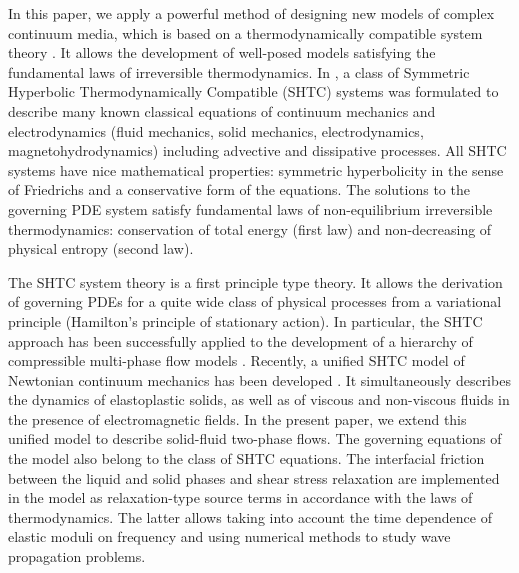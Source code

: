 \documentclass[3p,times,table]{article}
\begin{document}
In this paper, we apply a powerful method of designing  new models of 
complex continuum media, which is  based on a thermodynamically compatible system 
theory \cite{God1961,Godunov:1995a,Godunov1996}. It allows the development of 
well-posed models satisfying the
fundamental laws of irreversible thermodynamics. 
In \cite{Godunov:1995a,Rom1998,Romenski2001,Godrom2003,SHTC-GENERIC-CMAT},
a class of Symmetric Hyperbolic Thermodynamically Compatible (SHTC) systems was 
formulated  to describe many known classical equations of 
continuum mechanics and electrodynamics (fluid mechanics, solid mechanics, 
electrodynamics, magnetohydrodynamics)
including advective and dissipative processes. All SHTC systems have nice 
mathematical properties: symmetric hyperbolicity in the sense of Friedrichs 
\cite{Friedrichs1958} and
a conservative form of the equations. The solutions to the governing PDE system 
satisfy 
fundamental laws of non-equilibrium irreversible thermodynamics:  
conservation of total energy (first law) and non-decreasing of  physical 
entropy (second law). 

The SHTC system theory is a first principle type theory. It allows the derivation of
governing PDEs for a quite wide class of physical 
processes from a variational principle \cite{SHTC-GENERIC-CMAT} (Hamilton’s 
principle of stationary action). In particular, the SHTC approach has been 
successfully applied to the development of a hierarchy of compressible 
multi-phase flow models 
\cite{Romenski2007,RomDrikToro2010,Romenski2016,PeshGrmRom2015}.
 Recently, a unified SHTC model of Newtonian continuum mechanics has been developed 
\cite{DPRZ2016,DPRZ2017}. It simultaneously describes the dynamics of 
elastoplastic solids, as well as of viscous and non-viscous fluids in the presence 
of electromagnetic fields. 
In the present paper, we extend this unified model to  describe 
solid-fluid two-phase flows. The governing equations of the model 
also belong to the class of SHTC equations. The interfacial friction between the
liquid and solid phases and shear stress relaxation are implemented in the 
model as relaxation-type source terms in accordance with the laws of 
thermodynamics. 
The latter allows taking into account the time dependence of elastic moduli on frequency and using numerical methods to study wave 
propagation problems.  
\end{document}
